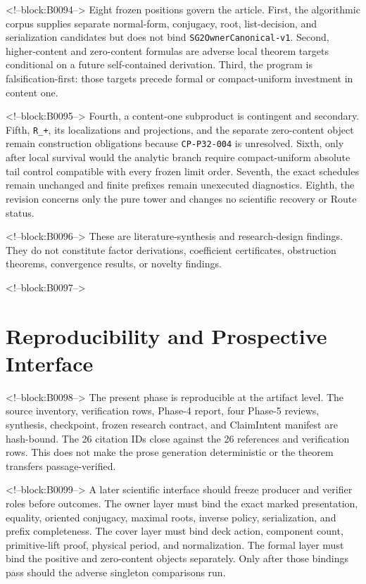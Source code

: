 \documentclass[11pt]{article}
\begin{document}
<!--block:B0094-->
Eight frozen positions govern the article. First, the algorithmic corpus
supplies separate normal-form, conjugacy, root, list-decision, and
serialization candidates but does not bind
\texttt{SG2OwnerCanonical-v1}. Second, higher-content and zero-content
formulas are adverse local theorem targets conditional on a future
self-contained derivation. Third, the program is falsification-first:
those targets precede formal or compact-uniform investment in content
one.

<!--block:B0095-->
Fourth, a content-one subproduct is contingent and secondary. Fifth,
\texttt{R\_+}, its localizations and projections, and the separate
zero-content object remain construction obligations because
\texttt{CP-P32-004} is unresolved. Sixth, only after local survival
would the analytic branch require compact-uniform absolute tail control
compatible with every frozen limit order. Seventh, the exact schedules
remain unchanged and finite prefixes remain unexecuted diagnostics.
Eighth, the revision concerns only the pure tower and changes no
scientific recovery or Route status.

<!--block:B0096-->
These are literature-synthesis and research-design findings. They do not
constitute factor derivations, coefficient certificates, obstruction
theorems, convergence results, or novelty findings.

<!--block:B0097-->
\hypertarget{6-reproducibility-and-prospective-interface}{%
\section{Reproducibility and Prospective
Interface}\label{6-reproducibility-and-prospective-interface}}

<!--block:B0098-->
The present phase is reproducible at the artifact level. The source
inventory, verification rows, Phase-4 report, four Phase-5 reviews,
synthesis, checkpoint, frozen research contract, and ClaimIntent manifest are
hash-bound. The 26 citation IDs close against the 26 references and
verification rows. This does not make the prose generation deterministic
or the theorem transfers passage-verified.

<!--block:B0099-->
A later scientific interface should freeze producer and verifier roles
before outcomes. The owner layer must bind the exact marked
presentation, equality, oriented conjugacy, maximal roots, inverse
policy, serialization, and prefix completeness. The cover layer must
bind deck action, component count, primitive-lift proof, physical
period, and normalization. The formal layer must bind the positive and
zero-content objects separately. Only after those bindings pass should
the adverse singleton comparisons run.
\end{document}
